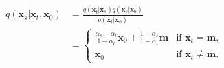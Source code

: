 \begin{align}
\label{eq:qxs}
    q(\bm{x}_s|\bm{x}_t, \bm{x}_0) &= \frac{q(\bm{x}_t|\bm{x}_s)q(\bm{x}_s|\bm{x}_0)}{q(\bm{x}_t|\bm{x}_0)} \nonumber \\
    &= \begin{cases}
        \frac{\alpha_s-\alpha_t}{1-\alpha_t}\bm{x}_0+\frac{1-\alpha_s}{1-\alpha_t}\bm{m} & \text{if } \bm{x}_t=\bm{m}, \\
        \bm{x}_0 & \text{if }\bm{x}_t\neq\bm{m}.
    \end{cases}
\end{align}